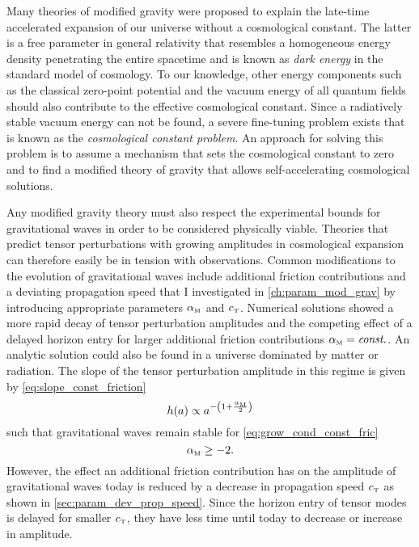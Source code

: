 \documentclass[12pt,parskip=half]{scrreprt}
\begin{document}
Many theories of modified gravity were proposed to explain the late-time accelerated expansion of our universe without a cosmological constant. The latter is a free parameter in general relativity that resembles a homogeneous energy density penetrating the entire spacetime and is known as \emph{dark energy} in the \LCDM standard model of cosmology. To our knowledge, other energy components such as the classical zero-point potential and the vacuum energy of all quantum fields should also contribute to the effective cosmological constant. Since a radiatively stable vacuum energy can not be found, a severe fine-tuning problem exists that is known as the \emph{cosmological constant problem}. An approach for solving this problem is to assume a mechanism that sets the cosmological constant to zero and to find a modified theory of gravity that allows self-accelerating cosmological solutions.

Any modified gravity theory must also respect the experimental bounds for gravitational waves in order to be considered physically viable. Theories that predict tensor perturbations with growing amplitudes in cosmological expansion can therefore easily be in tension with observations. Common modifications to the evolution of gravitational waves include additional friction contributions and a deviating propagation speed that I investigated in \autoref{ch:param_mod_grav} by introducing appropriate parameters \({\alpha_{\textnormal{\tiny{M}}}}\) and \({c_{\textnormal{\tiny{T}}}}\). Numerical solutions showed a more rapid decay of tensor perturbation amplitudes and the competing effect of a delayed horizon entry for larger additional friction contributions \({\alpha_{\textnormal{\tiny{M}}}}=\textnormal{\textit{const.}}\). An analytic solution could also be found in a universe dominated by matter or radiation. The slope of the tensor perturbation amplitude in this regime is given by \eqref{eq:slope_const_friction}
\begin{equation}
	h(a) \propto a^{-\del{1+\frac{\alphaM}{2}}}
\end{equation}
such that gravitational waves remain stable for \eqref{eq:grow_cond_const_fric}
\begin{equation}
	{\alpha_{\textnormal{\tiny{M}}}} \geq -2
	\mathpunct{.}
\end{equation}
However, the effect an additional friction contribution has on the amplitude of gravitational waves today is reduced by a decrease in propagation speed \({c_{\textnormal{\tiny{T}}}}\) as shown in \autoref{sec:param_dev_prop_speed}. Since the horizon entry of tensor modes is delayed for smaller \({c_{\textnormal{\tiny{T}}}}\), they have less time until today to decrease or increase in amplitude.
\end{document}
